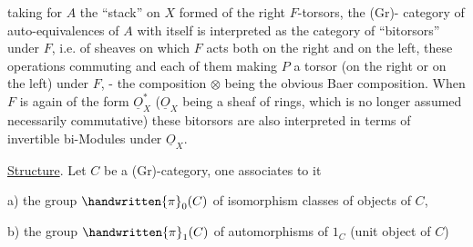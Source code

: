 
taking for $A$ the ``stack'' on $X$ formed of the right $F$-torsors, the (Gr)- category of auto-equivalences of $A$ with itself is interpreted as the category of ``bitorsors'' under $F$, i.e. of sheaves  on which $F$ acts both on the right and on the left, these operations commuting and each of them making $P$ a torsor (on the right or on the left) under $F$, - the composition $\otimes$ being the obvious Baer composition. When $F$ is again of the form $\underline{O}_{X}^{*}$ ($\underline{O}_{X}$ being a sheaf of rings, which is no longer assumed necessarily commutative) these bitorsors are also interpreted in terms of invertible bi-Modules under $\underline{O}_{X}$.

\uline{Structure}.  Let $C$ be a (Gr)-category, one associates to it

a) the group $\handwritten{\pi}_{0}(C)$ of isomorphism classes of objects of $C$,

b) the group $\handwritten{\pi}_{1}(C)$ of automorphisms of $1_C$ (unit object of $C$)


